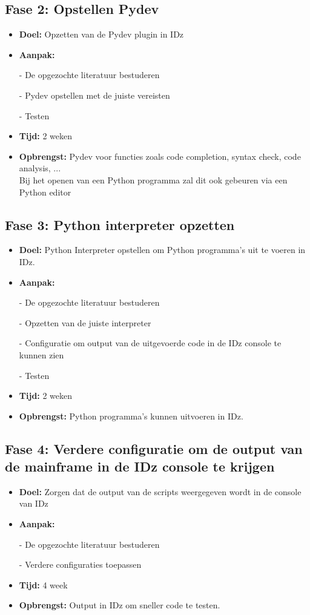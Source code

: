 \subsection{Fase 2: Opstellen Pydev}
\begin{itemize}
    \item \textbf{Doel:}
    Opzetten van de Pydev plugin in IDz
    \item \textbf{Aanpak:}
    \item[-] De opgezochte literatuur bestuderen
    \item[-] Pydev opstellen met de juiste vereisten
    \item[-] Testen
    \item \textbf{Tijd:} 2 weken
    \item \textbf{Opbrengst:}
    Pydev voor functies zoals code completion, syntax check, code analysis, ... \\ 
    Bij het openen van een Python programma zal dit ook gebeuren via een Python editor
\end{itemize}


\subsection{Fase 3: Python interpreter opzetten}
\begin{itemize}
    \item \textbf{Doel:}
    Python Interpreter opstellen om Python programma's uit te voeren in IDz.
    \item \textbf{Aanpak:}
    \item[-] De opgezochte literatuur bestuderen
    \item[-] Opzetten van de juiste interpreter
    \item[-] Configuratie om output van de uitgevoerde code in de IDz console te kunnen zien
    \item[-] Testen
    
    \item \textbf{Tijd:} 2 weken
    \item \textbf{Opbrengst:}
    Python programma's kunnen uitvoeren in IDz.
\end{itemize}


\subsection{Fase 4: Verdere configuratie om de output van de mainframe in de IDz console te krijgen}
\begin{itemize}
    \item \textbf{Doel:}
    Zorgen dat de output van de scripts weergegeven wordt in de console van IDz
    \item \textbf{Aanpak:}
    \item[-] De opgezochte literatuur bestuderen
    \item[-] Verdere configuraties toepassen
    
    \item \textbf{Tijd:} 4 week
    \item \textbf{Opbrengst:}
    Output in IDz om sneller code te testen. 
\end{itemize}

